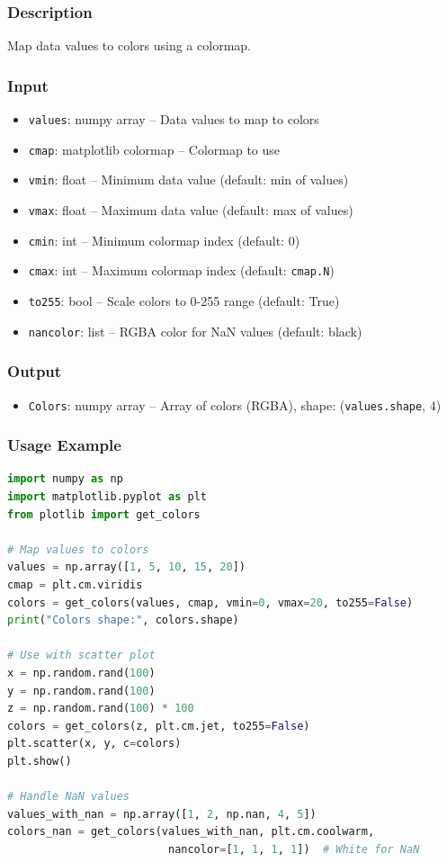 \documentclass[11pt,a4paper]{article}
\begin{document}
\subsubsection{Description}
Map data values to colors using a colormap.

\subsubsection{Input}
\begin{itemize}[leftmargin=*]
    \item \texttt{values}: numpy array -- Data values to map to colors
    \item \texttt{cmap}: matplotlib colormap -- Colormap to use
    \item \texttt{vmin}: float -- Minimum data value (default: min of values)
    \item \texttt{vmax}: float -- Maximum data value (default: max of values)
    \item \texttt{cmin}: int -- Minimum colormap index (default: 0)
    \item \texttt{cmax}: int -- Maximum colormap index (default: \texttt{cmap.N})
    \item \texttt{to255}: bool -- Scale colors to 0-255 range (default: True)
    \item \texttt{nancolor}: list -- RGBA color for NaN values (default: black)
\end{itemize}

\subsubsection{Output}
\begin{itemize}[leftmargin=*]
    \item \texttt{Colors}: numpy array -- Array of colors (RGBA), shape: (\texttt{values.shape}, 4)
\end{itemize}

\subsubsection{Usage Example}
\begin{lstlisting}[language=Python, caption=Mapping values to colors]
import numpy as np
import matplotlib.pyplot as plt
from plotlib import get_colors

# Map values to colors
values = np.array([1, 5, 10, 15, 20])
cmap = plt.cm.viridis
colors = get_colors(values, cmap, vmin=0, vmax=20, to255=False)
print("Colors shape:", colors.shape)

# Use with scatter plot
x = np.random.rand(100)
y = np.random.rand(100)
z = np.random.rand(100) * 100
colors = get_colors(z, plt.cm.jet, to255=False)
plt.scatter(x, y, c=colors)
plt.show()

# Handle NaN values
values_with_nan = np.array([1, 2, np.nan, 4, 5])
colors_nan = get_colors(values_with_nan, plt.cm.coolwarm, 
                         nancolor=[1, 1, 1, 1])  # White for NaN
\end{lstlisting}
\end{document}
